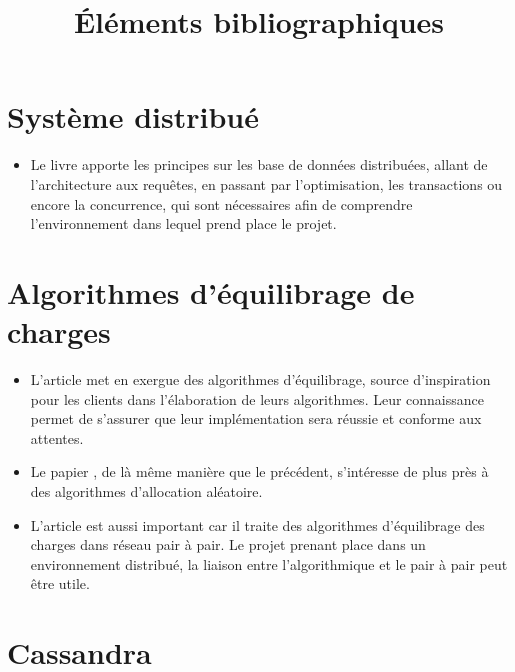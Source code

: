 \documentclass[12 pt]{article}
\title{Éléments bibliographiques}
\begin{document}
\maketitle
\section{Système distribué}

\begin{itemize}
\item Le livre \cite{Ozsu2011} apporte les principes sur les base de données distribuées, allant de l'architecture aux requêtes, en passant par l'optimisation, les transactions ou encore la concurrence, qui sont nécessaires afin de comprendre l'environnement dans lequel prend place le projet.
\end{itemize}

\section{Algorithmes d'équilibrage de charges}

\begin{itemize}
\item L'article \cite{BalancedAlloc99} met en exergue des algorithmes d'équilibrage, source d'inspiration pour les clients dans l'élaboration de leurs algorithmes. Leur connaissance permet de s'assurer que leur implémentation sera réussie et conforme aux attentes.

\item Le papier \cite{RandomChoices05}, de là même manière que le précédent, s'intéresse de plus près à des algorithmes d'allocation aléatoire.

\item L'article \cite{LoadBalancingPeertoPeer14} est aussi important car il traite des algorithmes d'équilibrage des charges dans réseau pair à pair. Le projet prenant place dans un environnement distribué, la liaison entre l'algorithmique et le pair à pair peut être utile. 
\end{itemize}

\section{Cassandra}
\end{document}
